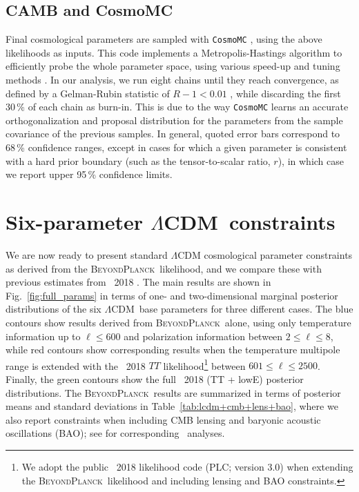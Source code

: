 \documentclass[twocolumn]{aa}
\def\LCDM{$\Lambda$CDM}
\newcommand{\BP}{\textsc{BeyondPlanck}}
\begin{document}
\subsection{CAMB and CosmoMC}
Final cosmological parameters are sampled with \texttt{CosmoMC}
\citep{cosmomc}, using the above likelihoods as inputs. This code
implements a Metropolis-Hastings algorithm to efficiently probe the
whole parameter space, using various speed-up and tuning methods
\citep{neal2005,lewis2013b}. In our analysis, we run eight chains
until they reach convergence, as defined by a Gelman-Rubin statistic
of $R-1<0.01$ \citep{gelman:1992}, while discarding the first 30\,\%
of each chain as burn-in. This is due to the way \texttt{CosmoMC}
learns an accurate orthogonalization and proposal distribution for the
parameters from the sample covariance of the previous samples. In
general, quoted error bars correspond to 68\,\% confidence ranges,
except in cases for which a given parameter is consistent with a hard
prior boundary (such as the tensor-to-scalar ratio, $r$), in which
case we report upper 95\,\% confidence limits. 

\section{Six-parameter \LCDM\ constraints}
\label{sec:LCDM_constraints}

We are now ready to present standard $\Lambda$CDM cosmological
parameter constraints as derived from the \BP\ likelihood, and we
compare these with previous estimates from \Planck\ 2018
\citep{planck2016-l06}. The main results are shown in
Fig.~\ref{fig:full_params} in terms of one- and two-dimensional
marginal posterior distributions of the six \LCDM\ base parameters for
three different cases. The blue contours show results derived from
\BP\ alone, using only temperature information up to $\ell\le600$ and
polarization information between $2\le\ell\le 8$, while red contours
show corresponding results when the temperature multipole range is
extended with the \Planck\ 2018 $TT$ likelihood\footnote{We adopt the
public \Planck\ 2018 likelihood code (PLC; version 3.0) when
extending the \BP\ likelihood and including lensing and BAO
constraints.} between $601\le\ell\le2500$. Finally, the green contours
show the full \Planck\ 2018 (TT + lowE) posterior distributions. The \BP\ results
are summarized in terms of posterior means and standard deviations in
Table~\ref{tab:lcdm+cmb+lens+bao}, where we also report constraints
when including CMB lensing and baryonic
acoustic oscillations (BAO); see \citep{planck2013-p11,
planck2014-a15} for corresponding \Planck\ analyses. 
\end{document}
